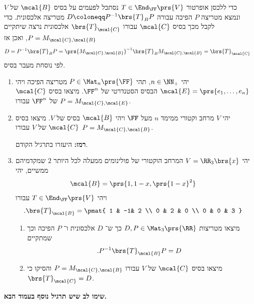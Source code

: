 \documentclass[a4paper,10pt,twoside,openany]{article}
\begin{document}
\begin{exercise}
כדי ללכסן אופרטור
$T \in \End_\FF\prs{V}$
נסתכל לפעמים על בסיס
$\mcal{B}$
של
$V$
ונמצא מטריצה
$P$
הפיכה עבורה
$D \coloneqq P^{-1} \brs{T}_B P$
מטריצה אלכסונית.
כדי לקבל מכך בסיס
$\mcal{C}$
עבורו
$\brs{T}_{\mcal{C}}$
אלכסונית נרצה שיתקיים
$P = M_{\mcal{C},\mcal{B}}$,
ואכן אז
\[D = P^{-1} \brs{T}_B P = \prs{M_{\mcal{C},\mcal{B}}}^{-1} \brs{T}_B M_{\mcal{C},\mcal{B}} = \brs{T}_{\mcal{C}}\]
לפי נוסחת מעבר בסיס.

\begin{enumerate}
\item יהי
$n \in \NN_+$,
תהי
$P \in \Mat_n\prs{\FF}$
מטריצה הפיכה ויהי
$\mcal{E} = \prs{e_1, \ldots, e_n}$
הבסיס הסטנדרטי של
$\FF^n$.
מיצאו בסיס
$\mcal{C}$
של
$\FF^n$
עבורו
$P = M_{\mcal{C},\mcal{E}}$.

\item יהי
$V$
מרחב וקטורי ממימד
$n$
מעל
$\FF$
ויהי
$\mcal{B}$
בסיס של
$V$.
מיצאו בסיס
$\mcal{C}$
של
$V$
עבורו
$P = M_{\mcal{C},\mcal{B}}$.

\textbf{רמז:}
היעזרו בתרגיל הקודם.

\item
יהי
$V = \RR_3\brs{x}$
המרחב הוקטורי של פולינומים ממעלה לכל היותר
$2$
שמקדמיהם ממשיים, יהי
\[\mcal{B} = \prs{1, 1-x, \prs{1-x}^2}\]
ויהי
$T \in \End_\FF\prs{V}$
עבורו
\[\text{.} \brs{T}_\mcal{B} = \pmat{
1 & -1& 2 \\
0 & 2 & 0 \\
0 & 0 & 3
}\]
\begin{enumerate}
\item 
מיצאו מטריצות
$D,P \in \Mat_3\prs{\RR}$
כך ש־%
$D$
אלכסונית ו־%
$P$
הפיכה וכך שמתקיים
\[\text{.} P^{-1} \brs{T}_\mcal{B} P = D\]
\item
מיצאו בסיס
$\mcal{C}$
של
$V$
עבורו
$P = M_{\mcal{C},\mcal{B}}$
והסיקו כי
$\brs{T}_\mcal{C} = D$.
\end{enumerate}
\end{enumerate}
\end{exercise}

\textbf{שימו לב שיש תרגיל נוסף בעמוד הבא.}
\end{document}
